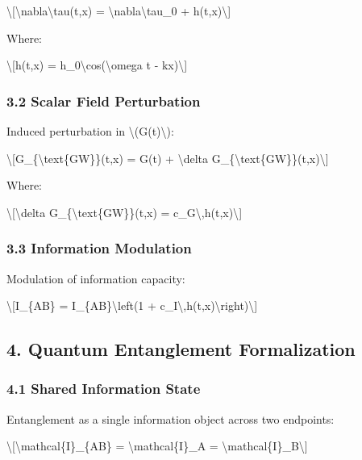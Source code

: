 \documentclass[
  10pt,
]{article}
\begin{document}
\textbackslash{[}\textbackslash nabla\textbackslash tau(t,x) =
\textbackslash nabla\textbackslash tau\_0 + h(t,x)\textbackslash{]}

Where:

\textbackslash{[}h(t,x) = h\_0\textbackslash cos(\textbackslash omega t
- kx)\textbackslash{]}

\hypertarget{scalar-field-perturbation}{%
\subsubsection{3.2 Scalar Field
Perturbation}\label{scalar-field-perturbation}}

Induced perturbation in \textbackslash(G(t)\textbackslash):

\textbackslash{[}G\_\{\textbackslash text\{GW\}\}(t,x) = G(t) +
\textbackslash delta
G\_\{\textbackslash text\{GW\}\}(t,x)\textbackslash{]}

Where:

\textbackslash{[}\textbackslash delta
G\_\{\textbackslash text\{GW\}\}(t,x) =
c\_G\textbackslash,h(t,x)\textbackslash{]}

\hypertarget{information-modulation}{%
\subsubsection{3.3 Information
Modulation}\label{information-modulation}}

Modulation of information capacity:

\textbackslash{[}I\_\{AB\}\textquotesingle{} =
I\_\{AB\}\textbackslash left(1 +
c\_I\textbackslash,h(t,x)\textbackslash right)\textbackslash{]}

\hypertarget{quantum-entanglement-formalization}{%
\subsection{4. Quantum Entanglement
Formalization}\label{quantum-entanglement-formalization}}

\hypertarget{shared-information-state}{%
\subsubsection{4.1 Shared Information
State}\label{shared-information-state}}

Entanglement as a single information object across two endpoints:

\textbackslash{[}\textbackslash mathcal\{I\}\_\{AB\} =
\textbackslash mathcal\{I\}\_A =
\textbackslash mathcal\{I\}\_B\textbackslash{]}
\end{document}
